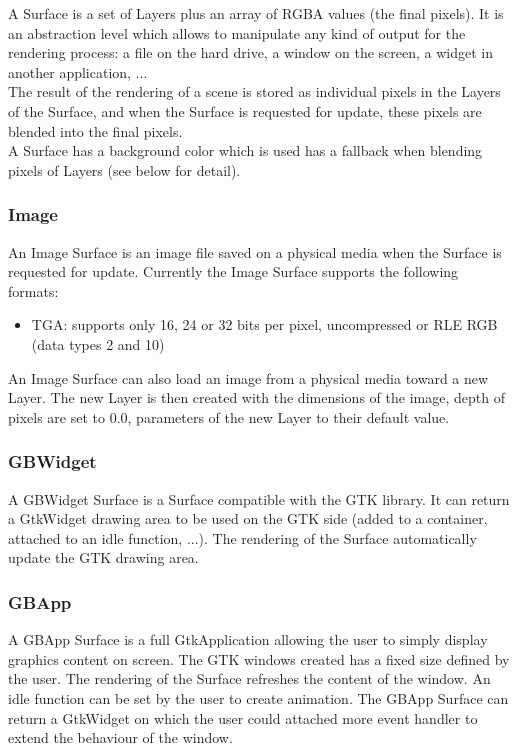 A Surface is a set of Layers plus an array of RGBA values (the final pixels). It is an abstraction level which allows to manipulate any kind of output for the rendering process: a file on the hard drive, a window on the screen, a widget in another application, ...\\

The result of the rendering of a scene is stored as individual pixels in the Layers of the Surface, and when the Surface is requested for update, these pixels are blended into the final pixels.\\

A Surface has a background color which is used has a fallback when blending pixels of Layers (see below for detail).

\subsubsection{Image}

An Image Surface is an image file saved on a physical media when the Surface is requested for update. Currently the Image Surface supports the following formats:\\
\begin{itemize}
\item TGA: supports only 16, 24 or 32 bits per pixel, uncompressed or RLE RGB (data types 2 and 10)
\end{itemize}

An Image Surface can also load an image from a physical media toward a new Layer. The new Layer is then created with the dimensions of the image, depth of pixels are set to 0.0, parameters of the new Layer to their default value.\\

\subsubsection{GBWidget}

A GBWidget Surface is a Surface compatible with the GTK library. It can return a GtkWidget drawing area to be used on the GTK side (added to a container, attached to an idle function, ...). The rendering of the Surface automatically update the GTK drawing area. 

\subsubsection{GBApp}

A GBApp Surface is a full GtkApplication allowing the user to simply display graphics content on screen. The GTK windows created has a fixed size defined by the user. The rendering of the Surface refreshes the content of the window. An idle function can be set by the user to create animation. The GBApp Surface can return a GtkWidget on which the user could attached more event handler to extend the behaviour of the window.\\ 

